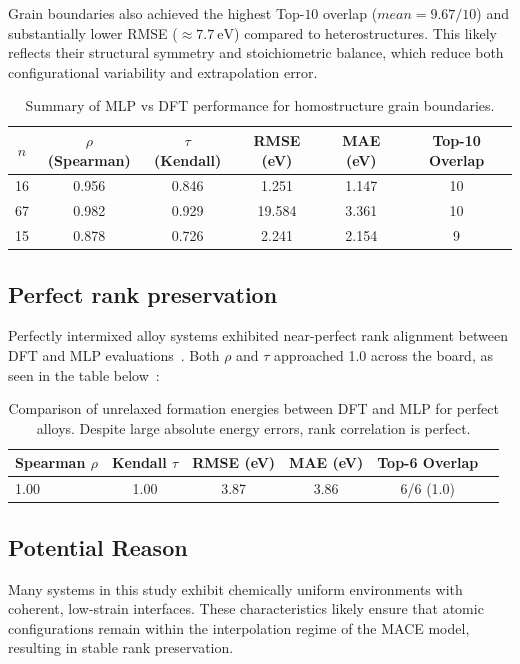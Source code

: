 Grain boundaries also achieved the highest Top-$10$ overlap ($mean = 9.67/10$) and substantially lower RMSE ($\approx 7.7\ \text{eV}$) compared to heterostructures.
This likely reflects their structural symmetry and stoichiometric balance, which reduce both configurational variability and extrapolation error.
\begin{table}[H]
\centering
\begin{tabular}{cccccc}
\toprule
$n$ & $\rho$ (Spearman) & $\tau$ (Kendall) & RMSE (eV) & MAE (eV) & Top-10 Overlap \\
\midrule
16 & 0.956 & 0.846 & 1.251 & 1.147 & 10 \\
67 & 0.982 & 0.929 & 19.584 & 3.361 & 10 \\
15 & 0.878 & 0.726 & 2.241 & 2.154 & 9 \\
\bottomrule
\end{tabular}
\caption{Summary of MLP vs DFT performance for homostructure grain boundaries.}
\label{tab:grain_boundaries}
\end{table}

\newpage \subsection*{Perfect rank preservation}
Perfectly intermixed alloy systems exhibited near-perfect rank alignment between DFT and MLP evaluations~\nocite{}.
Both $\rho$ and $\tau$ approached 1.0 across the board, as seen in the table below~\nocite{}:

\begin{table}[H]
    \centering
    \caption{Comparison of unrelaxed formation energies between DFT and MLP for perfect alloys. Despite large absolute energy errors, rank correlation is perfect.}
    \label{tab:perfect_alloy_comparison}
    \begin{tabular}{lccccc}
        \toprule
        Spearman $\rho$ & Kendall $\tau$ & RMSE (eV) & MAE (eV) & Top-6 Overlap \\
        \midrule
        1.00 & 1.00 & 3.87 & 3.86 & 6/6 (1.0) \\
        \bottomrule
    \end{tabular}
\end{table}

\subsection*{Potential Reason}

Many systems in this study exhibit chemically uniform environments with coherent, low-strain interfaces.
These characteristics likely ensure that atomic configurations remain within the interpolation regime of the MACE model, resulting in stable rank preservation.

